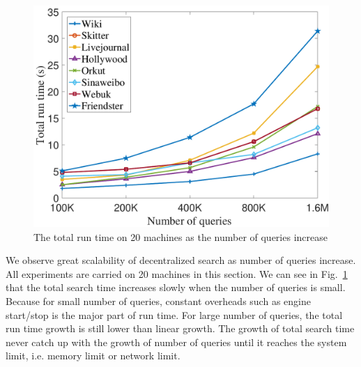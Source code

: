 \begin{figure}[t]
    \centering
    \includegraphics[width=\linewidth]{./figures/scale_query.pdf}
    \caption{The total run time on 20 machines as the number of queries increase}
    \label{fig:scale_query}
\end{figure}

We observe great scalability of decentralized search as number of queries increase. All experiments are carried on 20 machines in this section. We can see in Fig.~\ref{fig:scale_query} that the total search time increases slowly when the number of queries is small. Because for small number of queries, constant overheads such as engine start/stop is the major part of run time. For large number of queries, the total run time growth is still lower than linear growth. The growth of total search time never catch up with the growth of number of queries until it reaches the system limit, i.e. memory limit or network limit.

%

